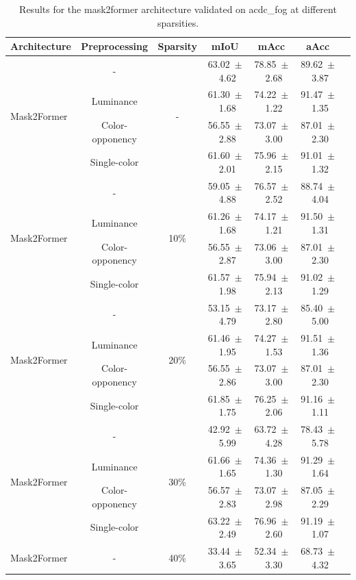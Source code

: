\begin{table}[h]
\centering
\caption{Results for the mask2former architecture validated on acdc_fog at different sparsities.}
\begin{tabular}{@{}lccc ccc@{}}
\toprule
Architecture & Preprocessing & Sparsity & mIoU & mAcc & aAcc \\
\midrule

\multirow{4}{*}{Mask2Former} & - & \multirow{4}{*}{-} & 63.02~$\pm$~4.62 & 78.85~$\pm$~2.68 & 89.62~$\pm$~3.87 \\
& Luminance & & 61.30~$\pm$~1.68 & 74.22~$\pm$~1.22 & 91.47~$\pm$~1.35 \\
& Color-opponency & & 56.55~$\pm$~2.88 & 73.07~$\pm$~3.00 & 87.01~$\pm$~2.30 \\
& Single-color & & 61.60~$\pm$~2.01 & 75.96~$\pm$~2.15 & 91.01~$\pm$~1.32 \\
\midrule
\multirow{4}{*}{Mask2Former} & - & \multirow{4}{*}{10\%} & 59.05~$\pm$~4.88 & 76.57~$\pm$~2.52 & 88.74~$\pm$~4.04 \\
& Luminance & & 61.26~$\pm$~1.68 & 74.17~$\pm$~1.21 & 91.50~$\pm$~1.31 \\
& Color-opponency & & 56.55~$\pm$~2.87 & 73.06~$\pm$~3.00 & 87.01~$\pm$~2.30 \\
& Single-color & & 61.57~$\pm$~1.98 & 75.94~$\pm$~2.13 & 91.02~$\pm$~1.29 \\
\midrule
\multirow{4}{*}{Mask2Former} & - & \multirow{4}{*}{20\%} & 53.15~$\pm$~4.79 & 73.17~$\pm$~2.80 & 85.40~$\pm$~5.00 \\
& Luminance & & 61.46~$\pm$~1.95 & 74.27~$\pm$~1.53 & 91.51~$\pm$~1.36 \\
& Color-opponency & & 56.55~$\pm$~2.86 & 73.07~$\pm$~3.00 & 87.01~$\pm$~2.30 \\
& Single-color & & 61.85~$\pm$~1.75 & 76.25~$\pm$~2.06 & 91.16~$\pm$~1.11 \\
\midrule
\multirow{4}{*}{Mask2Former} & - & \multirow{4}{*}{30\%} & 42.92~$\pm$~5.99 & 63.72~$\pm$~4.28 & 78.43~$\pm$~5.78 \\
& Luminance & & 61.66~$\pm$~1.65 & 74.36~$\pm$~1.30 & 91.29~$\pm$~1.64 \\
& Color-opponency & & 56.57~$\pm$~2.83 & 73.07~$\pm$~2.98 & 87.05~$\pm$~2.29 \\
& Single-color & & 63.22~$\pm$~2.49 & 76.96~$\pm$~2.60 & 91.19~$\pm$~1.07 \\
\midrule
\multirow{4}{*}{Mask2Former} & - & \multirow{4}{*}{40\%} & 33.44~$\pm$~3.65 & 52.34~$\pm$~3.30 & 68.73~$\pm$~4.32 \\

\end{tabular}
\end{table}
